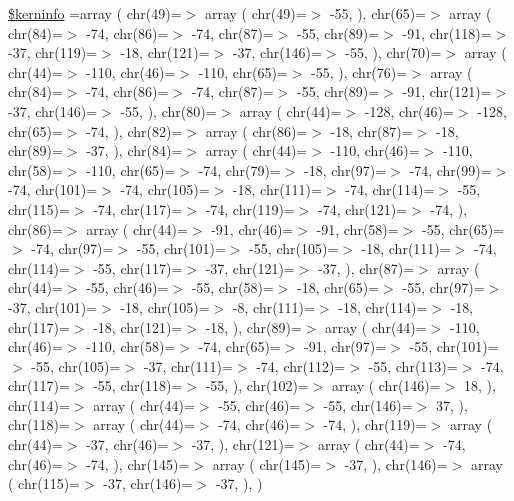 \begin{DoxyCompactItemize}
\hyperlink{chelveticab_8php_ab4bb7d3b0332c517f6a42a1924f01000}{\$kerninfo} =array ( chr(49)=$>$ array ( chr(49)=$>$ -\/55, ), chr(65)=$>$ array ( chr(84)=$>$ -\/74, chr(86)=$>$ -\/74, chr(87)=$>$ -\/55, chr(89)=$>$ -\/91, chr(118)=$>$ -\/37, chr(119)=$>$ -\/18, chr(121)=$>$ -\/37, chr(146)=$>$ -\/55, ), chr(70)=$>$ array ( chr(44)=$>$ -\/110, chr(46)=$>$ -\/110, chr(65)=$>$ -\/55, ), chr(76)=$>$ array ( chr(84)=$>$ -\/74, chr(86)=$>$ -\/74, chr(87)=$>$ -\/55, chr(89)=$>$ -\/91, chr(121)=$>$ -\/37, chr(146)=$>$ -\/55, ), chr(80)=$>$ array ( chr(44)=$>$ -\/128, chr(46)=$>$ -\/128, chr(65)=$>$ -\/74, ), chr(82)=$>$ array ( chr(86)=$>$ -\/18, chr(87)=$>$ -\/18, chr(89)=$>$ -\/37, ), chr(84)=$>$ array ( chr(44)=$>$ -\/110, chr(46)=$>$ -\/110, chr(58)=$>$ -\/110, chr(65)=$>$ -\/74, chr(79)=$>$ -\/18, chr(97)=$>$ -\/74, chr(99)=$>$ -\/74, chr(101)=$>$ -\/74, chr(105)=$>$ -\/18, chr(111)=$>$ -\/74, chr(114)=$>$ -\/55, chr(115)=$>$ -\/74, chr(117)=$>$ -\/74, chr(119)=$>$ -\/74, chr(121)=$>$ -\/74, ), chr(86)=$>$ array ( chr(44)=$>$ -\/91, chr(46)=$>$ -\/91, chr(58)=$>$ -\/55, chr(65)=$>$ -\/74, chr(97)=$>$ -\/55, chr(101)=$>$ -\/55, chr(105)=$>$ -\/18, chr(111)=$>$ -\/74, chr(114)=$>$ -\/55, chr(117)=$>$ -\/37, chr(121)=$>$ -\/37, ), chr(87)=$>$ array ( chr(44)=$>$ -\/55, chr(46)=$>$ -\/55, chr(58)=$>$ -\/18, chr(65)=$>$ -\/55, chr(97)=$>$ -\/37, chr(101)=$>$ -\/18, chr(105)=$>$ -\/8, chr(111)=$>$ -\/18, chr(114)=$>$ -\/18, chr(117)=$>$ -\/18, chr(121)=$>$ -\/18, ), chr(89)=$>$ array ( chr(44)=$>$ -\/110, chr(46)=$>$ -\/110, chr(58)=$>$ -\/74, chr(65)=$>$ -\/91, chr(97)=$>$ -\/55, chr(101)=$>$ -\/55, chr(105)=$>$ -\/37, chr(111)=$>$ -\/74, chr(112)=$>$ -\/55, chr(113)=$>$ -\/74, chr(117)=$>$ -\/55, chr(118)=$>$ -\/55, ), chr(102)=$>$ array ( chr(146)=$>$ 18, ), chr(114)=$>$ array ( chr(44)=$>$ -\/55, chr(46)=$>$ -\/55, chr(146)=$>$ 37, ), chr(118)=$>$ array ( chr(44)=$>$ -\/74, chr(46)=$>$ -\/74, ), chr(119)=$>$ array ( chr(44)=$>$ -\/37, chr(46)=$>$ -\/37, ), chr(121)=$>$ array ( chr(44)=$>$ -\/74, chr(46)=$>$ -\/74, ), chr(145)=$>$ array ( chr(145)=$>$ -\/37, ), chr(146)=$>$ array ( chr(115)=$>$ -\/37, chr(146)=$>$ -\/37, ), )
\end{DoxyCompactItemize}



